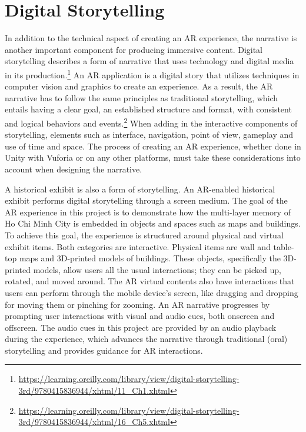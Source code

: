 \section{Digital Storytelling}
In addition to the technical aspect of creating an AR experience, the narrative is another important component for producing immersive content. Digital storytelling describes a form of narrative that uses technology and digital media in its production.\footnote{\url{https://learning.oreilly.com/library/view/digital-storytelling-3rd/9780415836944/xhtml/11\_Ch1.xhtml}} An AR application is a digital story that utilizes techniques in computer vision and graphics to create an experience. As a result, the AR narrative has to follow the same principles as traditional storytelling, which entails having a clear goal, an established structure and format, with consistent and logical behaviors and events.\footnote{\url{https://learning.oreilly.com/library/view/digital-storytelling-3rd/9780415836944/xhtml/16\_Ch5.xhtml}} When adding in the interactive components of storytelling, elements such as interface, navigation, point of view, gameplay and use of time and space. The process of creating an AR experience, whether done in Unity with Vuforia or on any other platforms, must take these considerations into account when designing the narrative.

A historical exhibit is also a form of storytelling. An AR-enabled historical exhibit performs digital storytelling through a screen medium. The goal of the AR experience in this project is to demonstrate how the multi-layer memory of Ho Chi Minh City is embedded in objects and spaces such as maps and buildings. To achieve this goal, the experience is structured around physical and virtual exhibit items. Both categories are interactive. Physical items are wall and table-top maps and 3D-printed models of buildings. These objects, specifically the 3D-printed models, allow users all the usual interactions; they can be picked up, rotated, and moved around. The AR virtual contents also have interactions that users can perform through the mobile device's screen, like dragging and dropping for moving them or pinching for zooming. An AR narrative progresses by prompting user interactions with visual and audio cues, both onscreen and offscreen. The audio cues in this project are provided by an audio playback during the experience, which advances the narrative through traditional (oral) storytelling and provides guidance for AR interactions. 

